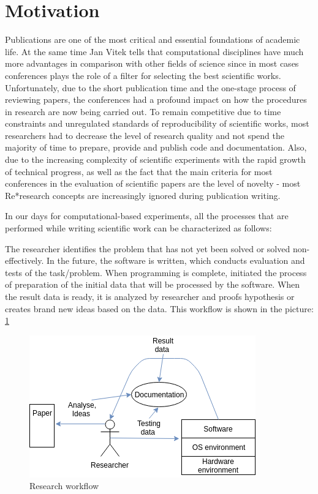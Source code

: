 \section{Motivation}
Publications are one of the most critical and essential foundations of academic life. At the same time Jan Vitek\cite{DBLP:conf/emsoft/VitekK11} tells that computational disciplines have much more advantages in comparison with other fields of science since in most cases conferences plays the role of a filter for selecting the best scientific works. Unfortunately, due to the short publication time and the one-stage process of reviewing papers, the conferences had a profound impact on how the procedures in research are now being carried out. To remain competitive due to time constraints and unregulated standards of reproducibility of scientific works, most researchers had to decrease the level of research quality and not spend the majority of time to prepare, provide and publish code and documentation. Also, due to the increasing complexity of scientific experiments with the rapid growth of technical progress, as well as the fact that the main criteria for most conferences in the evaluation of scientific papers are the level of novelty - most Re*research concepts are increasingly ignored during publication writing.\par
In our days for computational-based experiments, all the processes that are performed while writing scientific work can be characterized as follows: \par
The researcher identifies the problem that has not yet been solved or solved non-effectively. In the future, the software is written, which conducts evaluation and tests of the task/problem. When programming is complete,  initiated the process of preparation of the initial data that will be processed by the software. When the result data is ready, it is analyzed by researcher and proofs hypothesis or creates brand new ideas based on the data. This workflow is shown in the picture: \ref{fig:workflow} \par
\begin{figure}[h!]
  \includegraphics[scale=0.8]{fig/reresearch.png}
  \caption{Research workflow\cite{gith}}
  \label{fig:workflow}
\end{figure}

